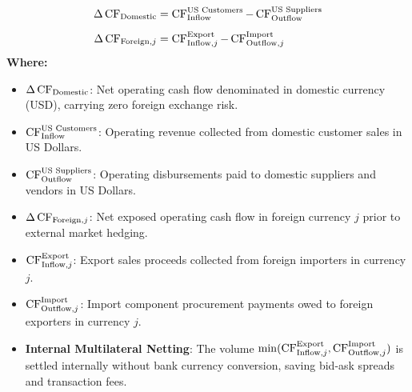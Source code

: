 \begin{formulabox}
\begin{align*}
    \Delta \operatorname{CF}_{\text{Domestic}} &= \operatorname{CF}_{\text{Inflow}}^{\text{US Customers}} - \operatorname{CF}_{\text{Outflow}}^{\text{US Suppliers}} \\[0.5em]
    \Delta \operatorname{CF}_{\text{Foreign}, j} &= \operatorname{CF}_{\text{Inflow}, j}^{\text{Export}} - \operatorname{CF}_{\text{Outflow}, j}^{\text{Import}}
\end{align*}
\textbf{Where:}
\begin{itemize}[leftmargin=*, noitemsep]
    \item $\Delta \operatorname{CF}_{\text{Domestic}}$: Net operating cash flow denominated in domestic currency (USD), carrying zero foreign exchange risk.
    \item $\operatorname{CF}_{\text{Inflow}}^{\text{US Customers}}$: Operating revenue collected from domestic customer sales in US Dollars.
    \item $\operatorname{CF}_{\text{Outflow}}^{\text{US Suppliers}}$: Operating disbursements paid to domestic suppliers and vendors in US Dollars.
    \item $\Delta \operatorname{CF}_{\text{Foreign}, j}$: Net exposed operating cash flow in foreign currency $j$ prior to external market hedging.
    \item $\operatorname{CF}_{\text{Inflow}, j}^{\text{Export}}$: Export sales proceeds collected from foreign importers in currency $j$.
    \item $\operatorname{CF}_{\text{Outflow}, j}^{\text{Import}}$: Import component procurement payments owed to foreign exporters in currency $j$.
    \item \textbf{Internal Multilateral Netting}: The volume $\min(\operatorname{CF}_{\text{Inflow}, j}^{\text{Export}}, \operatorname{CF}_{\text{Outflow}, j}^{\text{Import}})$ is settled internally without bank currency conversion, saving bid-ask spreads and transaction fees.
\end{itemize}
\end{formulabox}

